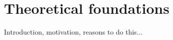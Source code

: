 \chapter{Theoretical foundations}
\label{cha:theoretical_foundations}

Introduction, motivation, reasons to do this...




